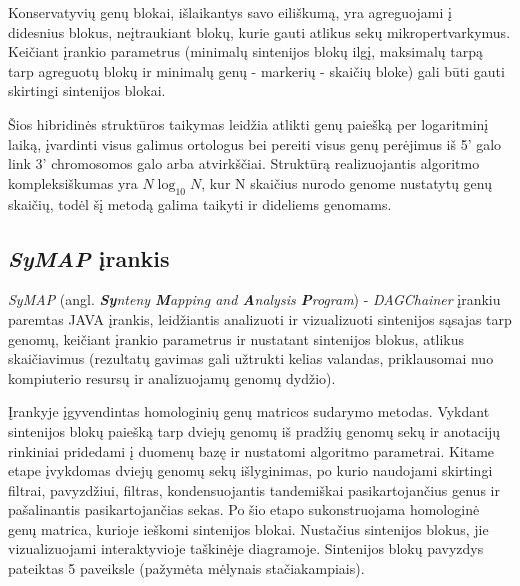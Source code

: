 \documentclass[12pt]{article}
\begin{document}
Konservatyvių genų blokai, išlaikantys savo eiliškumą, yra agreguojami į
didesnius blokus, neįtraukiant blokų, kurie gauti atlikus sekų
mikropertvarkymus. Keičiant įrankio parametrus (minimalų sintenijos blokų
ilgį, maksimalų tarpą tarp agreguotų blokų ir minimalų genų - markerių - skaičių
bloke) gali būti gauti skirtingi sintenijos blokai.

Šios hibridinės struktūros taikymas leidžia atlikti genų paiešką per logaritminį
laiką, įvardinti visus galimus ortologus bei pereiti visus genų perėjimus iš 5'
galo link 3' chromosomos galo arba atvirkščiai. Struktūrą realizuojantis
algoritmo kompleksiškumas yra $ N\log_{10}N $, kur N skaičius nurodo genome
nustatytų genų skaičių, todėl šį metodą galima taikyti ir dideliems genomams.

\subsection{\emph{SyMAP} įrankis}
\emph{SyMAP}\cite{SYMAP} (angl. \emph{\textbf{Sy}nteny \textbf{M}apping and
\textbf{A}nalysis \textbf{P}rogram}) - \emph{DAGChainer}\cite{DAGCHAINER}
įrankiu paremtas JAVA įrankis, leidžiantis analizuoti ir vizualizuoti sintenijos
sąsajas tarp genomų, keičiant įrankio parametrus ir nustatant sintenijos blokus,
atlikus skaičiavimus (rezultatų gavimas gali užtrukti kelias valandas,
priklausomai nuo kompiuterio resursų ir analizuojamų genomų dydžio).

Įrankyje įgyvendintas homologinių genų matricos sudarymo metodas. Vykdant
sintenijos blokų paiešką tarp dviejų genomų iš pradžių genomų sekų ir anotacijų
rinkiniai pridedami į duomenų bazę ir nustatomi algoritmo parametrai. Kitame
etape įvykdomas dviejų genomų sekų išlyginimas, po kurio naudojami skirtingi
filtrai, pavyzdžiui, filtras, kondensuojantis tandemiškai pasikartojančius
genus ir pašalinantis pasikartojančias sekas. Po šio etapo sukonstruojama
homologinė genų matrica, kurioje ieškomi sintenijos blokai. Nustačius sintenijos
blokus, jie vizualizuojami interaktyvioje taškinėje diagramoje. Sintenijos blokų
pavyzdys pateiktas 5 paveiksle (pažymėta mėlynais stačiakampiais).
\end{document}
